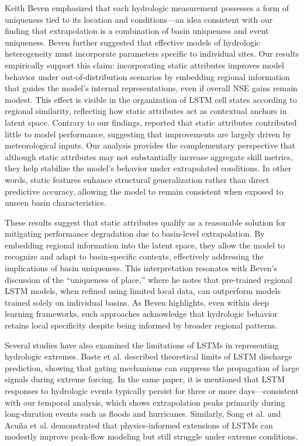 \documentclass{article}
\begin{document}
Keith Beven \cite{Beven2000} emphasized that each hydrologic measurement possesses a form of uniqueness tied to its location and conditions—an idea consistent with our finding that extrapolation is a combination of basin uniqueness and event uniqueness. Beven further suggested that effective models of hydrologic heterogeneity must incorporate parameters specific to individual sites. Our results empirically support this claim: incorporating static attributes improves model behavior under out-of-distribution scenarios by embedding regional information that guides the model’s internal representations, even if overall NSE gains remain modest. This effect is visible in the organization of LSTM cell states according to regional similarity, reflecting how static attributes act as contextual anchors in latent space.
Contrary to our findings, \cite{Heudorfer2025} reported that static attributes contributed little to model performance, suggesting that improvements are largely driven by meteorological inputs. Our analysis provides the complementary perspective that although static attributes may not substantially increase aggregate skill metrics, they help stabilize the model’s behavior under extrapolated conditions. In other words, static features enhance structural generalization rather than direct predictive accuracy, allowing the model to remain consistent when exposed to unseen basin characteristics.

These results suggest that static attributes qualify as a reasonable solution for mitigating performance degradation due to basin-level extrapolation. By embedding regional information into the latent space, they allow the model to recognize and adapt to basin-specific contexts, effectively addressing the implications of basin uniqueness. This interpretation resonates with Beven’s \cite{Beven2020dl}discussion of the “uniqueness of place,” where he notes that pre-trained regional LSTM models, when refined using limited local data, can outperform models trained solely on individual basins. As Beven highlights, even within deep learning frameworks, such approaches acknowledge that hydrologic behavior retains local specificity despite being informed by broader regional patterns.

Several studies have also examined the limitations of LSTMs in representing hydrologic extremes. Baste et al. \cite{baste2025unveiling} described theoretical limits of LSTM discharge prediction, showing that gating mechanisms can suppress the propagation of large signals during extreme forcing. In the same paper, it is mentioned that LSTM responses to hydrologic events typically persist for three or more days—consistent with our temporal analysis, which shows extrapolation peaks primarily during long-duration events such as floods and hurricanes. Similarly, Song et al.\cite{song2025physicsinformed} and Acuña et al. \cite{acuna2024analyzing} demonstrated that physics-informed extensions of LSTMs can modestly improve peak-flow modeling but still struggle under extreme conditions.
\end{document}
